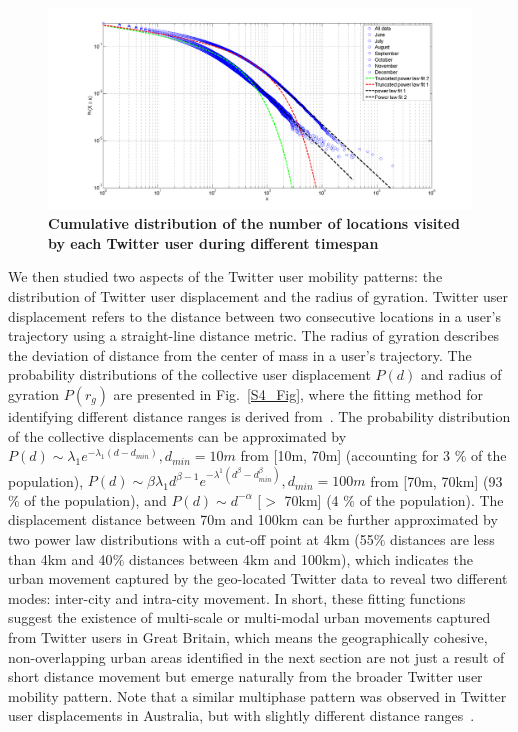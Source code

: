 \documentclass[]{tGIS2e}
\begin{document}
\begin{figure}[ht]
\includegraphics[width=1.0\linewidth]{./figure/S3_visitation}
\caption{ \bfseries{Cumulative distribution of the number of locations visited by each Twitter user during different timespan}}
\label{S3_Fig}
\end{figure}

We then studied two aspects of the Twitter user mobility patterns: the distribution of Twitter user displacement and the radius of gyration. 
Twitter user displacement refers to the distance between two consecutive locations in a user's trajectory using a straight-line distance metric.
The radius of gyration describes the deviation of distance from the center of mass in a user's trajectory.
The probability distributions of the collective user displacement $P(d)$ and radius of gyration $P(r_g)$ are presented in Fig.~\ref{S4_Fig}, where the fitting method for identifying different distance ranges is derived from~\citep{jurdak2015}.
The probability distribution of the collective displacements can be approximated by $P(d) \sim \lambda_{1} e^{-\lambda_{1}(d - d_{min})}, d_{min}=10m$ from [10m, 70m] (accounting for 3 $\%$ of the population),  $ P(d) \sim \beta\lambda_{1}d^{\beta-1}e^{-\lambda^{1}(d^\beta-d_{min}^\beta)}, d_{min} = 100m$ from [70m, 70km] (93 $\%$ of the population), and $P(d) \sim {d}^{-\alpha}$ [$>$ 70km] (4 $\%$ of the population). 
The displacement distance between 70m and 100km can be further approximated by two power law distributions with a cut-off point at 4km (55$\%$ distances are less than 4km and 40$\%$ distances between 4km and 100km), which indicates the urban movement captured by the geo-located Twitter data to reveal two different modes: inter-city and intra-city movement. 
In short, these fitting functions suggest the existence of multi-scale or multi-modal urban movements captured from Twitter users in Great Britain, which means the geographically cohesive, non-overlapping urban areas identified in the next section are not just a result of short distance movement but emerge naturally from the broader Twitter user mobility pattern.
Note that a similar multiphase pattern was observed in Twitter user displacements in Australia, but with slightly different distance ranges~\citep{jurdak2015}.
\end{document}

